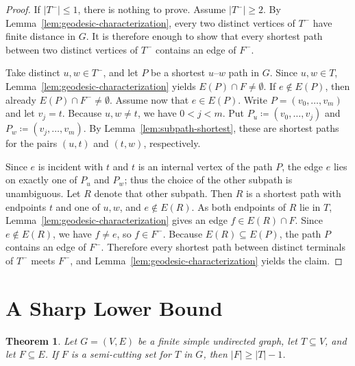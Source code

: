 \documentclass[11pt,a4paper]{amsart}
\theoremstyle{definition}
\theoremstyle{plain}
\newtheorem{theorem}[definition]{Theorem}
\begin{document}
\begin{proof}
If $|T^-|\le 1$, there is nothing to prove. Assume $|T^-|\ge 2$. By Lemma~\ref{lem:geodesic-characterization}, every two distinct vertices of $T^-$ have finite distance in $G$. It is therefore enough to show that every shortest path between two distinct vertices of $T^-$ contains an edge of $F^-$.

Take distinct $u,w\in T^-$, and let $P$ be a shortest $u$--$w$ path in $G$. Since $u,w\in T$, Lemma~\ref{lem:geodesic-characterization} yields $E(P)\cap F\neq\emptyset$. If $e\notin E(P)$, then already $E(P)\cap F^-\neq\emptyset$. Assume now that $e\in E(P)$. Write $P=(v_0,\dots,v_m)$ and let $v_j=t$. Because $u,w\neq t$, we have $0<j<m$. Put $P_u\coloneqq (v_0,\dots,v_j)$ and $P_w\coloneqq (v_j,\dots,v_m)$. By Lemma~\ref{lem:subpath-shortest}, these are shortest paths for the pairs $(u,t)$ and $(t,w)$, respectively.

Since $e$ is incident with $t$ and $t$ is an internal vertex of the path $P$, the edge $e$ lies on exactly one of $P_u$ and $P_w$; thus the choice of the other subpath is unambiguous. Let $R$ denote that other subpath. Then $R$ is a shortest path with endpoints $t$ and one of $u,w$, and $e\notin E(R)$. As both endpoints of $R$ lie in $T$, Lemma~\ref{lem:geodesic-characterization} gives an edge $f\in E(R)\cap F$. Since $e\notin E(R)$, we have $f\neq e$, so $f\in F^-$. Because $E(R)\subseteq E(P)$, the path $P$ contains an edge of $F^-$. Therefore every shortest path between distinct terminals of $T^-$ meets $F^-$, and Lemma~\ref{lem:geodesic-characterization} yields the claim.
\end{proof}

\section{A Sharp Lower Bound}

\begin{theorem}\label{thm:main}
Let $G=(V,E)$ be a finite simple undirected graph, let $T\subseteq V$, and let $F\subseteq E$. If $F$ is a semi-cutting set for $T$ in $G$, then $|F|\ge |T|-1$.
\end{theorem}
\end{document}
